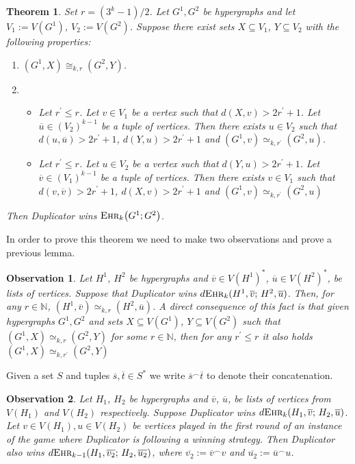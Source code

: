\documentclass[12pt,notitlepage,a4paper]{article}
\newtheorem{theorem}{Theorem}[section]
\newtheorem{obs}{Observation}[section]
\theoremstyle{definition}
\newcommand{\N}{\mathbb{N}}
\newcommand{\ehr}{\textsc{Ehr}}
\begin{document}
\begin{theorem}\label{ThmDuplicator}
	Set $r=(3^k-1)/2$.
	Let $G^1,G^2$ be hypergraphs and let $V_1:=V(G^1)$, $V_2:=
	V(G^2)$.
	Suppose there exist
	sets $X\subseteq V_1$, $Y\subseteq V_2$ with the 
	following properties:
	\begin{enumerate}
		\item[(1)] $(G^1,X)\cong_{k,r} (G^2,Y)$.
		\item[(2)]
		\begin{itemize}
			\item Let $r^\prime\leq r$. Let $v\in V_1$ be
			a vertex such that $d(X,v)> 2r^\prime + 1$. Let 
			$\overline{u}\in (V_2)^{k-1}$ be a tuple of vertices. 
			Then there exists $u\in V_2$ such that 
			$d(u,\overline{u})>2r^\prime+1$,
			$d(Y,u)>2r^\prime +1$ and
			$(G^1,v)\simeq_{k,r^\prime} (G^2,u)$.	
			\item Let $r^\prime\leq r$. Let $u\in V_2$ be
			a vertex such that $d(Y,u)> 2r^\prime + 1$. Let 
			$\overline{v}\in (V_1)^{k-1}$ be a tuple of vertices. 
			Then there exists $v\in V_1$ such that 
			$d(v,\overline{v})>2r^\prime+1$,
			$d(X,v)>2r^\prime +1$ and
			$(G^1,v)\simeq_{k,r^\prime} (G^2,u)$
		\end{itemize}
	\end{enumerate}
	Then Duplicator wins $\ehr_k\big(G^1;G^2\big)$.
\end{theorem}

In order to prove this theorem we need to make two observations
and prove a previous lemma. 

\begin{obs} \label{obs1}
	Let $H^1$, $H^2$ be hypergraphs and 
	$\overline{v}\in V(H^1)^*$, $\overline{u}\in V(H^2)^*$,
	be lists of vertices. Suppose that
	Duplicator wins $d\ehr_k(H^1,\overline{v}; \, H^2,\overline{u})$.
	Then, for any $r\in \N$, $(H^1, \overline{v})\simeq_{k,r} 
	(H^2,\overline{u})$. A direct consequence of this fact 
	is that 
	given hypergraphs $G^1, G^2$ and sets
	$X\subseteq V(G^1)$, $Y\subseteq V(G^2)$ such that
	$(G^1,X)\simeq_{k,r} (G^2,Y)$ for some $r\in \N$, 
	then for any $r^\prime \leq r$ it also holds 
	$(G^1,X)\simeq_{k,r^\prime} (G^2,Y)$
\end{obs}

Given a set $S$ and tuples $\overline{s},\overline{t}\in S^*$
we write $\overline{s}^\frown \overline{t}$ to denote their 
concatenation.  

\begin{obs} \label{obs2}
	Let $H_1$, $H_2$ be hypergraphs and 
	$\overline{v}$, $\overline{u}$, be lists of vertices
	from $V(H_1)$ and $V(H_2)$ respectively. Suppose 
	Duplicator wins $d\ehr_k(H_1,\overline{v};\,H_2,\overline{u})$. 
	Let $v\in V(H_1),u\in V(H_2)$ be vertices
	played in the first round of an instance of the game 
	where Duplicator is following a winning strategy. Then 
	Duplicator also wins $d\ehr_{k-1}(H_1,\overline{v_2}; \,
	H_2,\overline{u_2})$, where $\overline{v_2}:=\overline{v}^\frown v$
	and $\overline{u_2}:=\overline{u}^\frown u$.
\end{obs}
\end{document}
